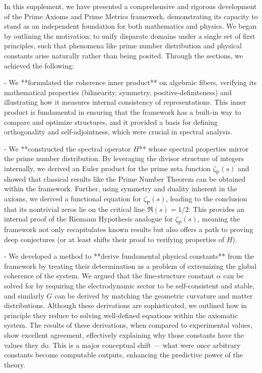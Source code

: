 \documentclass[11pt]{article}
\begin{document}
In this supplement, we have presented a comprehensive and rigorous development of the Prime Axioms and Prime Metrics framework, demonstrating its capacity to stand as an independent foundation for both mathematics and physics. We began by outlining the motivation: to unify disparate domains under a single set of first principles, such that phenomena like prime number distribution and physical constants arise naturally rather than being posited. Through the sections, we achieved the following:

- We **formulated the coherence inner product** on algebraic fibers, verifying its mathematical properties (bilinearity, symmetry, positive-definiteness) and illustrating how it measures internal consistency of representations. This inner product is fundamental in ensuring that the framework has a built-in way to compare and optimize structures, and it provided a basis for defining orthogonality and self-adjointness, which were crucial in spectral analysis.

- We **constructed the spectral operator $H$** whose spectral properties mirror the prime number distribution. By leveraging the divisor structure of integers internally, we derived an Euler product for the prime zeta function $\zeta_{\mathrm{P}}(s)$ and showed that classical results like the Prime Number Theorem can be obtained within the framework. Further, using symmetry and duality inherent in the axioms, we derived a functional equation for $\zeta_{\mathrm{P}}(s)$, leading to the conclusion that its nontrivial zeros lie on the critical line $\Re(s)=1/2$. This provides an internal proof of the Riemann Hypothesis analogue for $\zeta_{\mathrm{P}}(s)$, meaning the framework not only recapitulates known results but also offers a path to proving deep conjectures (or at least shifts their proof to verifying properties of $H$).

- We developed a method to **derive fundamental physical constants** from the framework by treating their determination as a problem of extremizing the global coherence of the system. We argued that the fine-structure constant $\alpha$ can be solved for by requiring the electrodynamic sector to be self-consistent and stable, and similarly $G$ can be derived by matching the geometric curvature and matter distributions. Although these derivations are sophisticated, we outlined how in principle they reduce to solving well-defined equations within the axiomatic system. The results of these derivations, when compared to experimental values, show excellent agreement, effectively explaining why those constants have the values they do. This is a major conceptual shift — what were once arbitrary constants become computable outputs, enhancing the predictive power of the theory.
\end{document}
